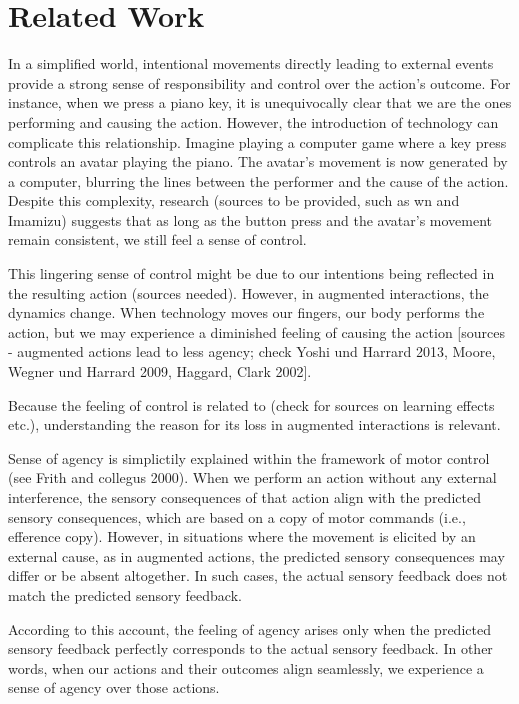 \section{Related Work}
In a simplified world, intentional movements directly leading to external events provide a strong sense of responsibility and control over the action's outcome. For instance, when we press a piano key, it is unequivocally clear that we are the ones performing and causing the action. However, the introduction of technology can complicate this relationship. Imagine playing a computer game where a key press controls an avatar playing the piano. The avatar's movement is now generated by a computer, blurring the lines between the performer and the cause of the action. Despite this complexity, research (sources to be provided, such as wn and Imamizu) suggests that as long as the button press and the avatar's movement remain consistent, we still feel a sense of control.

This lingering sense of control might be due to our intentions being reflected in the resulting action (sources needed). However, in augmented interactions, the dynamics change. When technology moves our fingers, our body performs the action, but we may experience a diminished feeling of causing the action [sources - augmented actions lead to less agency; check Yoshi und Harrard 2013, Moore, Wegner und Harrard 2009, Haggard, Clark 2002].

Because the feeling of control is related to (check for sources on learning effects etc.), understanding the reason for its loss in augmented interactions is relevant. 

Sense of agency is simplictily explained within the framework of motor control (see Frith and collegus 2000). When we perform an action without any external interference, the sensory consequences of that action align with the predicted sensory consequences, which are based on a copy of motor commands (i.e., efference copy). However, in situations where the movement is elicited by an external cause, as in augmented actions, the predicted sensory consequences may differ or be absent altogether. In such cases, the actual sensory feedback does not match the predicted sensory feedback.

According to this account, the feeling of agency arises only when the predicted sensory feedback perfectly corresponds to the actual sensory feedback. In other words, when our actions and their outcomes align seamlessly, we experience a sense of agency over those actions.

